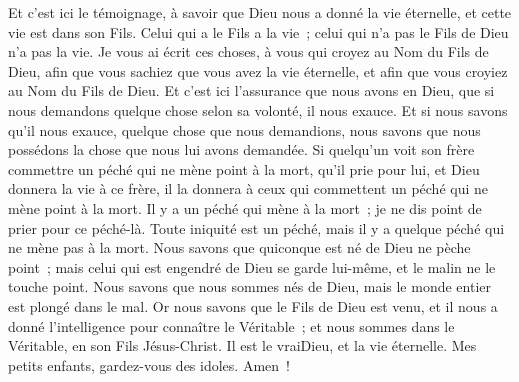 \begin{multicols}{2}
Et c'est ici le témoignage, à savoir que Dieu nous a donné la vie éternelle, et cette vie est dans son Fils.
Celui qui a le Fils a la vie~; celui qui n'a pas le Fils de Dieu n'a pas la vie.
Je vous ai écrit ces choses, à vous qui croyez au Nom du Fils de Dieu, afin que vous sachiez que vous avez la vie éternelle, et afin que vous croyiez au Nom du Fils de Dieu.
Et c'est ici l'assurance que nous avons en Dieu, que si nous demandons quelque chose selon sa volonté, il nous exauce.
Et si nous savons qu'il nous exauce, quelque chose que nous demandions, nous savons que nous possédons la chose que nous lui avons demandée.
Si quelqu'un voit son frère commettre un péché qui ne mène point à la mort, qu'il prie pour lui, et Dieu donnera la vie à ce frère, il la donnera à ceux qui commettent un péché qui ne mène point à la mort. Il y a un péché qui mène à la mort~; je ne dis point de prier pour ce péché-là.
Toute iniquité est un péché, mais il y a quelque péché qui ne mène pas à la mort.
Nous savons que quiconque est né de Dieu ne pèche point~; mais celui qui est engendré de Dieu se garde lui-même, et le malin ne le touche point.
Nous savons que nous sommes nés de Dieu, mais le monde entier est plongé dans le mal.
Or nous savons que le Fils de Dieu est venu, et il nous a donné l'intelligence pour connaître le Véritable~; et nous sommes dans le Véritable, en son Fils Jésus-Christ. Il est le vraiDieu, et la vie éternelle.
Mes petits enfants, gardez-vous des idoles. Amen~!
\PPE{}
\end{multicols}
